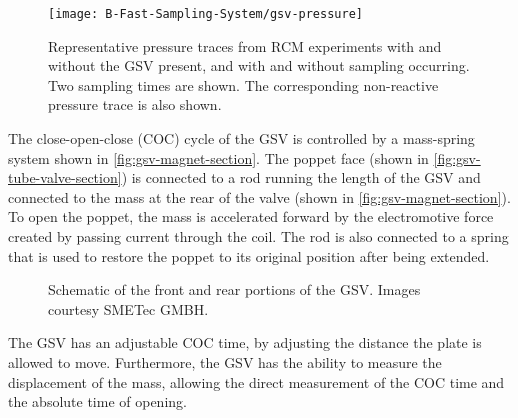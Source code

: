 \documentclass[../main.tex]{subfiles}
\begin{document}
\begin{figure}
\texttt{[image: B-Fast-Sampling-System/gsv-pressure]}
\caption{Representative pressure traces from RCM experiments with and
without the GSV present, and with and without sampling occurring. Two
sampling times are shown. The corresponding non-reactive pressure trace
is also shown.}
\label{fig:gsv-pressure}
\end{figure}

The close-open-close (COC) cycle of the GSV is controlled by a
mass-spring system shown in \cref{fig:gsv-magnet-section}. The poppet
face (shown in \cref{fig:gsv-tube-valve-section}) is connected to a rod
running the length of the GSV and connected to the mass at the rear
of the valve (shown in \cref{fig:gsv-magnet-section}). To open the
poppet, the mass is accelerated forward by the electromotive force
created by passing current through the coil. The rod is also connected
to a spring that is used to restore the poppet to its original position
after being extended.

\begin{figure}
        {\caption{Schematic of the front and rear portions of the GSV. Images courtesy
        SMETec GMBH.}
        \label{fig:gsv-schematic}}
\end{figure}

The GSV has an adjustable COC time, by adjusting the
distance the plate is allowed to move. Furthermore, the GSV has the ability
to measure the displacement of the mass, allowing the direct measurement of
the COC time and the absolute time of opening.
\end{document}
